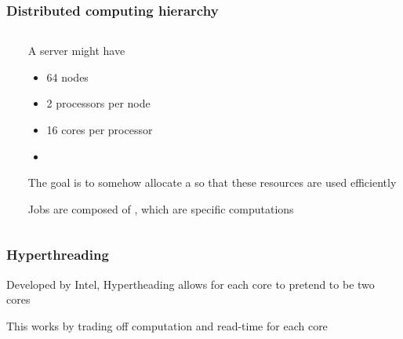 \documentclass[12pt]{beamer}
\begin{document}
\begin{frame}
\frametitle{Distributed computing hierarchy}
\begin{columns}[T]
    \begin{column}{.40\textwidth}

\begin{center}
\end{center}
  \end{column}
    \begin{column}{.60\textwidth}
  A server might have 

\begin{itemize}
\item 64 nodes
\item 2 processors per node
\item 16 cores per processor
\item {}
\end{itemize}


\vsp
The goal is to somehow allocate a  so that these resources are
used efficiently

\vsp
Jobs are composed of , which are specific computations
    \end{column}
  \end{columns}


\end{frame}



\begin{frame}
\frametitle{Hyperthreading}
Developed by Intel, Hypertheading allows for each core to pretend to be two cores
\begin{center}
\end{center}

\vsp
This works by trading off computation and read-time for each core
\end{frame}
\end{document}
